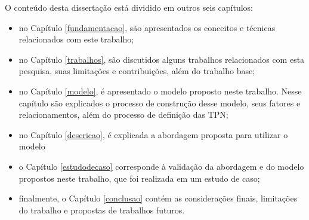 O conteúdo desta dissertação está dividido em outros seis capítulos:

\begin{itemize}
  \item no Capítulo \ref{fundamentacao}, são apresentados os conceitos e técnicas relacionados com este trabalho;
  \item no Capítulo \ref{trabalhos}, são discutidos alguns trabalhos relacionados com esta pesquisa, suas limitações e contribuições, além do trabalho base;
  \item no Capítulo \ref{modelo}, é apresentado o modelo proposto neste trabalho. Nesse capítulo são explicados o processo de construção desse modelo, seus fatores e relacionamentos, além do processo de definição das TPN;
  \item no Capítulo \ref{descricao}, é explicada a abordagem proposta para utilizar o modelo
  \item o Capítulo \ref{estudodecaso} corresponde à validação da abordagem e do modelo propostos neste trabalho, que foi realizada em um estudo de caso;
  \item finalmente, o Capítulo \ref{conclusao} contém as considerações finais, limitações do trabalho e propostas de trabalhos futuros.
\end{itemize}
